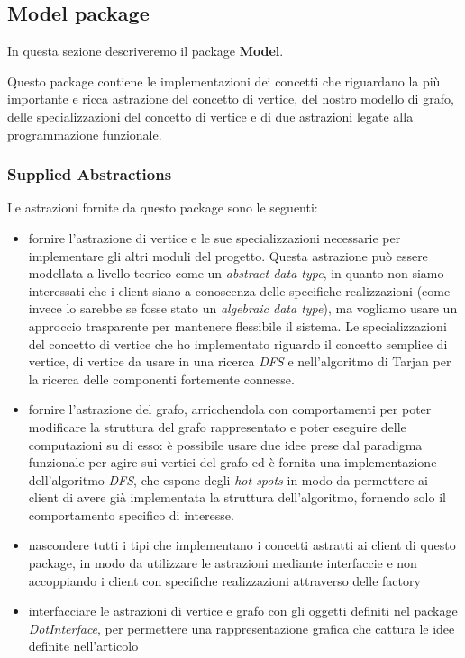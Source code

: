 \subsection{Model package}

In questa sezione descriveremo il package \textbf{Model}.

Questo package contiene le implementazioni dei concetti che riguardano
la pi\`u importante e ricca astrazione del concetto di vertice, del
nostro modello di grafo, delle specializzazioni del concetto di
vertice e di due astrazioni legate alla programmazione funzionale.

\subsubsection*{Supplied Abstractions}
\label{subsection:model-supplied-abstractions}
Le astrazioni fornite da questo package sono le seguenti:
\begin{itemize}
\label{itemize:model-supplied-abstraction}
\item fornire l'astrazione di vertice e le sue specializzazioni
  necessarie per implementare gli altri moduli del progetto. Questa
  astrazione pu\`o essere modellata a livello teorico come un
  \emph{abstract data type}, in quanto non siamo interessati che i
  client siano a conoscenza delle specifiche realizzazioni (come
  invece lo sarebbe se fosse stato un \emph{algebraic data type}), ma
  vogliamo usare un approccio trasparente per mantenere flessibile il
  sistema. Le specializzazioni del concetto di vertice che ho
  implementato riguardo il concetto semplice di vertice, di vertice da
  usare in una ricerca \emph{DFS} e nell'algoritmo di Tarjan per la
  ricerca delle componenti fortemente connesse.
\item fornire l'astrazione del grafo, arricchendola con comportamenti
  per poter modificare la struttura del grafo rappresentato e poter
  eseguire delle computazioni su di esso: \`e possibile usare due idee
  prese dal paradigma funzionale per agire sui vertici del grafo ed
  \`e fornita una implementazione dell'algoritmo \emph{DFS}, che espone
  degli \emph{hot spots} in modo da permettere ai client di avere
  gi\`a implementata la struttura dell'algoritmo, fornendo solo il
  comportamento specifico di interesse.
\item nascondere tutti i tipi che implementano i concetti astratti ai
  client di questo package, in modo da utilizzare le astrazioni
  mediante interfaccie e non accoppiando i client con specifiche
  realizzazioni attraverso delle factory 
\item interfacciare le astrazioni di vertice e grafo con gli oggetti
  definiti nel package \emph{DotInterface}, per permettere una
  rappresentazione grafica che cattura le idee definite nell'articolo
  \cite{tellingStories}
\end{itemize}


